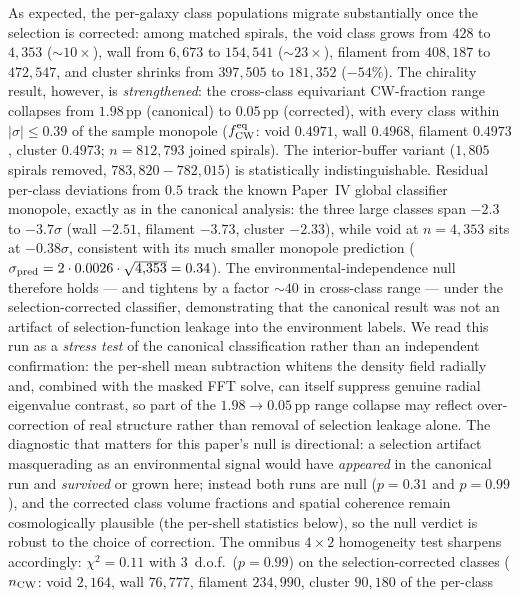 \documentclass[aps,prd,twocolumn,superscriptaddress,showpacs,preprintnumbers,nofootinbib,longbibliography,floatfix]{revtex4-2}
\begin{document}
As expected, the per-galaxy class populations migrate substantially
once the selection is corrected: among matched spirals, the void class
grows from $428$ to $4{,}353$ ($\sim\!10\times$), wall from $6{,}673$
to $154{,}541$ ($\sim\!23\times$), filament from $408{,}187$ to
$472{,}547$, and cluster shrinks from $397{,}505$ to $181{,}352$
($-54\%$). The chirality result, however, is \emph{strengthened}: the
cross-class equivariant CW-fraction range collapses from
$1.98$\,pp (canonical) to $0.05$\,pp (corrected), with every class
within $|\sigma| \le 0.39$ of the sample monopole
($f_{\rm CW}^{\rm eq}$: void $0.4971$, wall $0.4968$, filament
$0.4973$, cluster $0.4973$; $n = 812{,}793$ joined spirals). The
interior-buffer variant ($1{,}805$ spirals removed, $783{,}820-782{,}015$)
is statistically indistinguishable. Residual per-class deviations from $0.5$ track the
known Paper~IV global classifier monopole, exactly as in the
canonical analysis: the three large classes span $-2.3$ to
$-3.7\sigma$ (wall $-2.51$, filament $-3.73$, cluster $-2.33$), while
void at $n = 4{,}353$ sits at $-0.38\sigma$, consistent with its much
smaller monopole prediction
($\sigma_{\rm pred} = 2 \cdot 0.0026 \cdot \sqrt{4{,}353} = 0.34$). The environmental-independence null therefore holds --- and
tightens by a factor ${\sim}40$ in cross-class range --- under the
selection-corrected classifier, demonstrating that the canonical
result was not an artifact of selection-function leakage into the
environment labels. We read this run as a \emph{stress test} of the
canonical classification rather than an independent confirmation: the
per-shell mean subtraction whitens the density field radially and,
combined with the masked FFT solve, can itself suppress genuine
radial eigenvalue contrast, so part of the $1.98 \to 0.05$\,pp range
collapse may reflect over-correction of real structure rather than
removal of selection leakage alone. The diagnostic that matters for
this paper's null is directional: a selection artifact masquerading
as an environmental signal would have \emph{appeared} in the
canonical run and \emph{survived} or grown here; instead both runs
are null ($p = 0.31$ and $p = 0.99$), and the corrected class volume
fractions and spatial coherence remain cosmologically plausible (the
per-shell statistics below), so the null verdict is robust to the choice
of correction. The omnibus $4\times2$ homogeneity test sharpens
accordingly: $\chi^2 = 0.11$ with 3~d.o.f.\ ($p = 0.99$) on the
selection-corrected classes ($n_{\rm CW}$: void $2{,}164$, wall
$76{,}777$, filament $234{,}990$, cluster $90{,}180$ of the per-class
\end{document}
